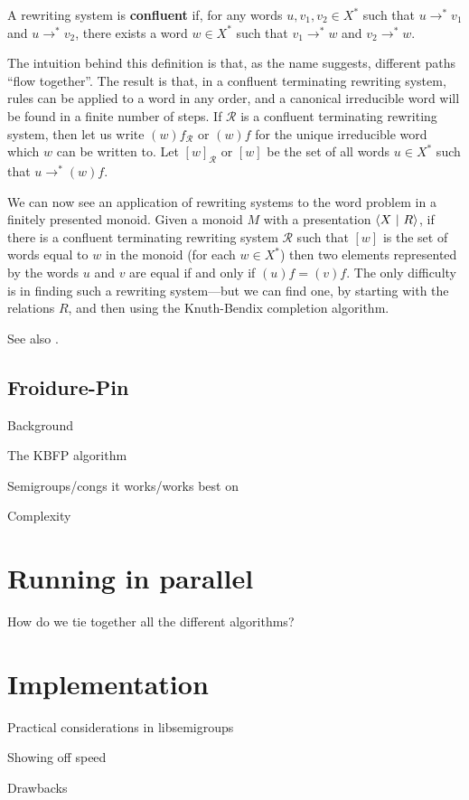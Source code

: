 \begin{definition}
  A rewriting system is \textbf{confluent} if, for any words $u,v_1,v_2 \in X^*$
  such that $u \to^* v_1$ and $u \to^* v_2$, there exists a word $w \in X^*$
  such that $v_1 \to^* w$ and $v_2 \to^* w$.
\end{definition}

The intuition behind this definition is that, as the name suggests, different
paths ``flow together''.  The result is that, in a confluent terminating
rewriting system, rules can be applied to a word in any order, and a canonical
irreducible word will be found in a finite number of steps.  If $\mathscr{R}$ is
a confluent terminating rewriting system, then let us write $(w)f_\mathscr{R}$
or $(w)f$ for the unique irreducible word which $w$ can be written to.  Let
$[w]_\mathscr{R}$ or $[w]$ be the set of all words $u \in X^*$ such that
$u \to^* (w)f$.

We can now see an application of rewriting systems to the word problem in a
finitely presented monoid.  Given a monoid $M$ with a presentation $\left\langle X ~\middle|~ R \right\rangle$,
if there is a confluent terminating rewriting system $\mathscr{R}$ such that
$[w]$ is the set of words equal to $w$ in the monoid (for each $w \in X^*$) then
two elements represented by the words $u$ and $v$ are equal if and only if
$(u)f = (v)f$.  The only difficulty is in finding such a rewriting system---but
we can find one, by starting with the relations $R$, and then using the
Knuth-Bendix completion algorithm.

See also \cite{knuth_bendix}.

\subsection{Froidure-Pin}

Background

The KBFP algorithm

Semigroups/congs it works/works best on

Complexity

\section{Running in parallel}

How do we tie together all the different algorithms?

\section{Implementation}

Practical considerations in libsemigroups

Showing off speed

Drawbacks
